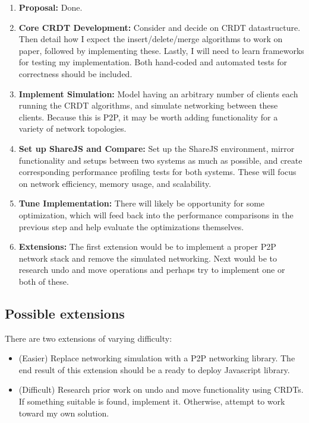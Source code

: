 \documentclass[12pt,a4paper,twoside]{article}
\begin{document}
\begin{enumerate}

\item \textbf{Proposal:} Done.

\item \textbf{Core CRDT Development:} Consider and decide on CRDT datastructure. Then detail how I expect
the insert/delete/merge algorithms to work on paper, followed by implementing these. Lastly, I will need to
learn frameworks for testing my implementation. Both hand-coded and automated tests for correctness should be included.

\item \textbf{Implement Simulation:} Model having an arbitrary number of clients each running the CRDT algorithms, and simulate
networking between these clients. Because this is P2P, it may be worth adding functionality for a variety of network
topologies.

\item \textbf{Set up ShareJS and Compare:} Set up the ShareJS environment, mirror functionality and setups 
between two systems as much as possible, and create corresponding performance profiling tests for both 
systems. These will focus on network efficiency, memory usage, and scalability.

\item \textbf{Tune Implementation:} There will likely be opportunity for some optimization, which will
feed back into the performance comparisons in the previous step and help evaluate the optimizations themselves.

\item \textbf{Extensions:} The first extension would be to implement a proper P2P network stack and remove the simulated 
networking. Next would be to research undo and move operations and perhaps try to implement one or both of these.

\end{enumerate}



\subsection*{Possible extensions}

There are two extensions of varying difficulty:

\begin{itemize}

\item (Easier) Replace networking simulation with a P2P networking library. The end result of this extension should be a ready to deploy Javascript library.

\item (Difficult) Research prior work on undo and move functionality using CRDTs. If something suitable is found, implement it. Otherwise, attempt to work toward my own solution.

\end{itemize}
\end{document}
